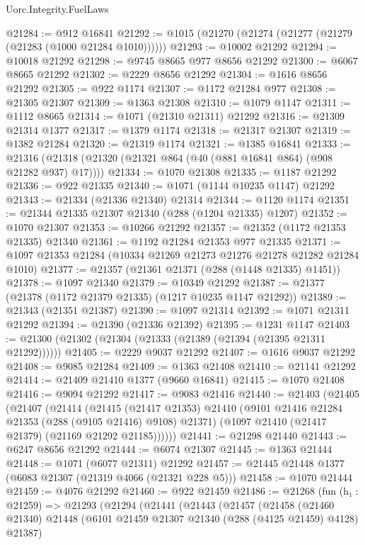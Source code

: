 \begin{lexlean}{Uorc.Integrity.FuelLaws}
\begin{coremodule}
@21284 := @912 @16841
@21292 := @1015 (@21270 (@21274 (@21277 (@21279 (@21283 (@1000 @21284 @1010))))))
@21293 := @10002 @21292
@21294 := @10018 @21292
@21298 := @9745 @8665 @977 @8656 @21292
@21300 := @6067 @8665 @21292
@21302 := @2229 @8656 @21292
@21304 := @1616 @8656 @21292
@21305 := @922 @1174
@21307 := @1172 @21284 @977
@21308 := @21305 @21307
@21309 := @1363 @21308
@21310 := @1079 @1147
@21311 := @1112 @8665
@21314 := @1071 (@21310 @21311) @21292
@21316 := @21309 @21314 @1377
@21317 := @1379 @1174
@21318 := @21317 @21307
@21319 := @1382 @21284
@21320 := @21319 @1174
@21321 := @1385 @16841
@21333 := @21316 (@21318 (@21320 (@21321 @864 (@40 (@881 @16841 @864) (@908 @21282 @937) @17))))
@21334 := @1070 @21308
@21335 := @1187 @21292
@21336 := @922 @21335
@21340 := @1071 (@1144 @10235 @1147) @21292
@21343 := @21334 (@21336 @21340) @21314
@21344 := @1120 @1174
@21351 := @21344 @21335 @21307 @21340 (@288 (@1204 @21335) @1207)
@21352 := @1070 @21307
@21353 := @10266 @21292
@21357 := @21352 (@1172 @21353 @21335) @21340
@21361 := @1192 @21284 @21353 @977 @21335
@21371 := @1097 @21353 @21284 (@10334 @21269 @21273 @21276 @21278 @21282 @21284 @1010)
@21377 := @21357 (@21361 @21371 (@288 (@1448 @21335) @1451))
@21378 := @1097 @21340
@21379 := @10349 @21292
@21387 := @21377 (@21378 (@1172 @21379 @21335) (@1217 @10235 @1147 @21292))
@21389 := @21343 (@21351 @21387)
@21390 := @1097 @21314
@21392 := @1071 @21311 @21292
@21394 := @21390 (@21336 @21392)
@21395 := @1231 @1147
@21403 := @21300 (@21302 (@21304 (@21333 (@21389 (@21394 (@21395 @21311 @21292))))))
@21405 := @2229 @9037 @21292
@21407 := @1616 @9037 @21292
@21408 := @9085 @21284
@21409 := @1363 @21408
@21410 := @21141 @21292
@21414 := @21409 @21410 @1377 (@9660 @16841)
@21415 := @1070 @21408
@21416 := @9094 @21292
@21417 := @9083 @21416
@21440 := @21403
    (@21405
      (@21407
        (@21414
          (@21415
            (@21417 @21353)
            @21410
            (@9101 @21416 @21284 @21353 (@288 (@9105 @21416) @9108) @21371)
            (@1097 @21410 (@21417 @21379) (@21169 @21292 @21185))))))
@21441 := @21298 @21440
@21443 := @6247 @8656 @21292
@21444 := @6074 @21307
@21445 := @1363 @21444
@21448 := @1071 (@6077 @21311) @21292
@21457 := @21445 @21448 @1377 (@6083 @21307 (@21319 @4066 (@21321 @228 @5)))
@21458 := @1070 @21444
@21459 := @4076 @21292
@21460 := @922 @21459
@21486 := @21268
    (fun (h₁ : @21259) =>
    @21293
      (@21294
        (@21441
          (@21443
            (@21457
              (@21458
                (@21460 @21340)
                @21448
                (@6101 @21459 @21307 @21340 (@288 (@4125 @21459) @4128) @21387)

\end{coremodule}
\end{lexlean}

